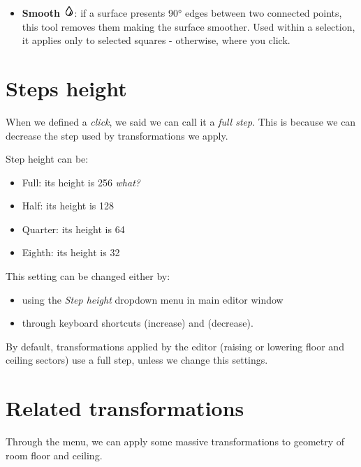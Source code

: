 \begin{itemize}
    \item \textbf{Smooth} \includegraphics[scale=0.5]{Resources/icons_toolbox/toolbox_Smooth-16.png}: if a surface presents 90° edges between two connected points, this tool removes them making the surface smoother. Used within a selection, it applies only to selected squares - otherwise, where you click.
\end{itemize}

\chapter{Steps height}

When we defined a \emph{click}, we said we can call it a \emph{full step}. This is because we can decrease the step used by transformations we apply.
\par Step height can be:
\begin{itemize}
    \item Full: its height is 256 \emph{what?} %
    \item Half: its height is 128
    \item Quarter: its height is 64
    \item Eighth: its height is 32
\end{itemize}
This setting can be changed either by:
\begin{itemize}
    \item using the \emph{Step height} dropdown menu in main editor window
    \item through keyboard shortcuts  (increase) and  (decrease).
\end{itemize}
\begin{remark}
    By default, transformations applied by the editor (raising or lowering floor and ceiling sectors) use a full step, unless we change this settings.
\end{remark}

\chapter{Related transformations}

Through the  menu, we can apply some massive transformations to geometry of room floor and ceiling.

